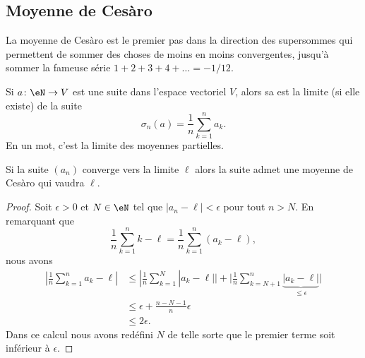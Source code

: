 \subsection{Moyenne de Cesàro}

La moyenne de Cesàro est le premier pas dans la direction des supersommes\cite{BIBooUCSPooNKNWEK} qui permettent de sommer des choses de moins en moins convergentes, jusqu'à sommer la fameuse série \( 1+2+3+4+\ldots=-1/12\).

\begin{definition}      \label{DEFooLVRLooTeowkn}
	Si \( a\colon \eN\to V \) est une suite dans l'espace vectoriel \( V\), alors sa  est la limite (si elle existe) de la suite
	\begin{equation}
		\sigma_n(a)=\frac{1}{ n }\sum_{k=1}^na_k.
	\end{equation}
	En un mot, c'est la limite des moyennes partielles.
\end{definition}

\begin{lemma}       \label{LemyGjMqM}
	Si la suite \( (a_n)\) converge vers la limite \( \ell\) alors la suite admet une moyenne de Cesàro qui vaudra \( \ell\).
\end{lemma}

\begin{proof}
	Soit \( \epsilon>0\) et \( N\in \eN\) tel que \( | a_n-\ell |<\epsilon\) pour tout \( n>N\). En remarquant que
	\begin{equation}
		\frac{1}{ n }\sum_{k=1}^nk-\ell=\frac{1}{ n }\sum_{k=1}^n(a_k-\ell),
	\end{equation}
	nous avons
	\begin{subequations}
		\begin{align}
			| \frac{1}{ n }\sum_{k=1}^na_k-\ell | & \leq| \frac{1}{ n }\sum_{k=1}^N| a_k-\ell | |+\big| \frac{1}{ n }\sum_{k=N+1}^n\underbrace{| a_k-\ell |}_{\leq \epsilon} \big| \\
			                                      & \leq \epsilon+\frac{ n-N-1 }{ n }\epsilon                                                                                      \\
			                                      & \leq 2\epsilon.
		\end{align}
	\end{subequations}
	Dans ce calcul nous avons redéfini \( N\) de telle sorte que le premier terme soit inférieur à \( \epsilon\).
\end{proof}

